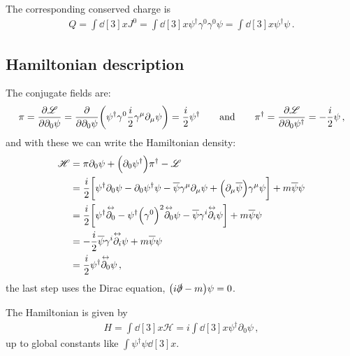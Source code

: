 \documentclass[main.tex]{subfiles}
\begin{document}
The corresponding conserved charge is 
%
\begin{align}
Q = \int \dd[3]{x} J^{0} = \int \dd[3]{x} \psi ^\dag \gamma^{0} \gamma^{0} \psi = \int \dd[3]{x} \psi ^\dag \psi 
\,.
\end{align}

\subsection{Hamiltonian description}

The conjugate fields are: 
%
\begin{align}
\pi = \pdv{\mathscr{L}}{\partial_0 \psi } = \pdv{}{\partial_0 \psi} \qty(\psi ^\dag \gamma^{0} \frac{i}{2} \gamma^{\mu } \partial_{\mu } \psi )= 
\frac{i}{2} \psi ^\dag
\qquad \text{and} \qquad
\pi ^\dag = \pdv{\mathscr{L}}{\partial_0 \psi ^\dag} = - \frac{i}{2} \psi 
\,,
\end{align}
%
and with these we can write the Hamiltonian density: 
%
\begin{subequations}
\begin{align}
\mathscr{H} &= \pi \partial_0 \psi + \qty(\partial_0 \psi ^\dag) \pi ^\dag - \mathscr{L}  \\
&= \frac{i}{2} \qty[ \psi ^\dag \partial_0 \psi - \partial_0 \psi ^\dag \psi - \overline{\psi} \gamma^{\mu } \partial_{\mu } \psi + \qty(\partial_{\mu } \overline{\psi})\gamma^{\mu } \psi ]
+m \overline{\psi} \psi   \\
&= \frac{i}{2} \qty[
\psi ^\dag \overset{\leftrightarrow}{\partial_0 } -
\psi ^\dag \qty(\gamma^{0})^2 \overset{\leftrightarrow}{\partial_0 }
\psi 
- \overline{\psi}  \gamma^{i}\overset{\leftrightarrow}{\partial_i }
\psi
]
+m \overline{\psi} \psi   \\
&= -\frac{i}{2} \overline{\psi}  \gamma^{i}\overset{\leftrightarrow}{\partial_i }
\psi
+ m \overline{\psi} \psi  \\
&= \frac{i}{2} \psi ^\dag \overset{\leftrightarrow}{\partial_0 } \psi 
\,,
\end{align}
\end{subequations}
%
the last step uses the Dirac equation, \(\qty(i \slashed{\partial} -m) \psi =0\).


The Hamiltonian is given by 
%
\begin{align}
H = \int \dd[3]{x} \mathscr{H} = i \int \dd[3]{x} \psi ^\dag \partial_0 \psi 
\,,
\end{align}
%
up to global constants like \(\int \psi ^\dag \psi \dd[3]{x}\). 
\end{document}
